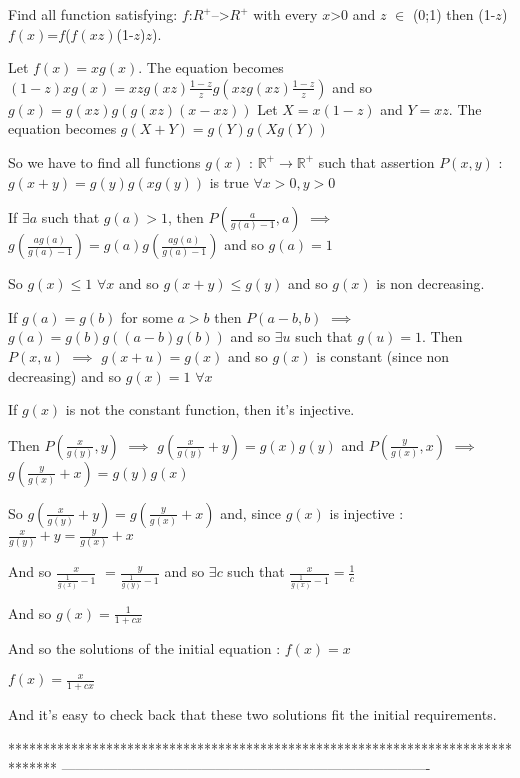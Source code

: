 \begin{solution}
	\begin{tcolorbox}Find all function satisfying: $ f$:$ R^ +$-->$ R^ +$
           with every $ x$>0 and $ z$ $ \in$ (0;1) then (1-$ z$) $ f(x)$=$ f$($ f(xz)$(1-$ z$)\/$ z$).\end{tcolorbox}

Let $ f(x)=xg(x)$. The equation becomes $ (1-z)xg(x)=xzg(xz)\frac{1-z}{z}g(xzg(xz)\frac{1-z}{z})$ and so $ g(x)=g(xz)g(g(xz)(x-xz))$
Let $ X=x(1-z)$ and $ Y=xz$. The equation becomes $ g(X+Y)=g(Y)g(Xg(Y))$

So we have to find all functions $ g(x)$ : $ \mathbb R^+\to\mathbb R^+$ such that assertion $ P(x,y)$ : $ g(x+y)=g(y)g(xg(y))$ is true $ \forall x>0,y>0$

If $ \exists a$ such that $ g(a)>1$, then $ P(\frac{a}{g(a)-1},a)$ $ \implies$ $ g(\frac{ag(a)}{g(a)-1})=g(a)g(\frac{ag(a)}{g(a)-1})$ and so $ g(a)=1$

So $ g(x)\leq 1$ $ \forall x$ and so $ g(x+y)\leq g(y)$ and so $ g(x)$ is non decreasing.

If $ g(a)=g(b)$ for some $ a>b$ then $ P(a-b,b)$ $ \implies$ $ g(a)=g(b)g((a-b)g(b))$ and so $ \exists u$ such that $ g(u)=1$.
Then $ P(x,u)$ $ \implies$ $ g(x+u)=g(x)$ and so $ g(x)$ is constant (since non decreasing) and so $ g(x)=1$ $ \forall x$

If $ g(x)$ is not the constant function, then it's injective.

Then $ P(\frac{x}{g(y)},y)$ $ \implies$ $ g(\frac{x}{g(y)}+y)=g(x)g(y)$ and $ P(\frac{y}{g(x)},x)$ $ \implies$ $ g(\frac{y}{g(x)}+x)=g(y)g(x)$

So $ g(\frac{x}{g(y)}+y)=g(\frac{y}{g(x)}+x)$ and, since $ g(x)$ is injective : $ \frac{x}{g(y)}+y=\frac{y}{g(x)}+x$

And so $ \frac{x}{\frac{1}{g(x)}-1}$ $ =\frac{y}{\frac{1}{g(y)}-1}$ and so $ \exists c$ such that $ \frac{x}{\frac{1}{g(x)}-1}=\frac{1}{c}$

And so $ g(x)=\frac{1}{1+cx}$


And so the solutions of the initial equation :
$ f(x)=x$

$ f(x)=\frac{x}{1+cx}$

And it's easy to check back that these two solutions fit the initial requirements.
\end{solution}
*******************************************************************************
-------------------------------------------------------------------------------

